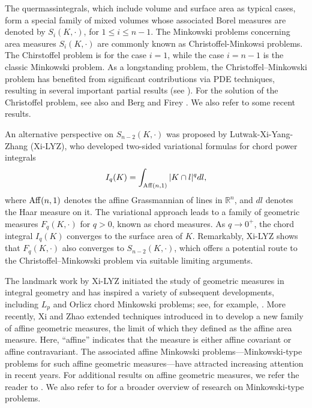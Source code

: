 \documentclass[12pt, oneside,reqno]{amsart}
\numberwithin{equation}{section}
\newtheorem{definition and theorem}[theorem]{Definition and Theorem}
\theoremstyle{plain}
\theoremstyle{remark}
\theoremstyle{definition}
\newcommand{\rn}{\mathbb R^n}
\begin{document}
The quermassintegrals, which include volume and surface area as typical cases, form a special family of mixed volumes whose associated Borel measures are denoted by $S_{i}(K,\cdot)$, for $1\leq i\leq n-1$.
The Minkowski problems concerning area measures $S_{i}(K,\cdot)$ are commonly known as Christoffel-Minkowsi problems.
The Chirstoffel problem is for the case $i=1$, while the case $i=n-1$ is the classic Minkowski problem. As a longstanding problem, the Christoffel–Minkowski problem has benefited from significant contributions via PDE techniques, resulting in several important partial results (see  \cite{GG, GLL, GM, GMZ}). For the solution of the Christoffel problem, see also \cite{GYY, GZ2, Sch1} and Berg and Firey \cite[Section 8.3.2]{Sch}. We also refer \cite{BHM1,BHM2, CGSF, MU} to some recent results.

An alternative perspective on $S_{n-2}(K,\cdot)$ was proposed by Lutwak-Xi-Yang-Zhang \cite{LXYZ2020} (Xi-LYZ), who developed two-sided variational formulas for chord power integrals 
\[I_q(K)=\int_{{\rm Aff}(n,1)}|K\cap l|^q dl,\]
where ${\rm Aff}(n,1)$ denotes the affine Grassmannian of lines in $\rn$, and $dl$ denotes the Haar measure on it. 
The variational approach leads to a family of 
geometric measures $F_q(K,\cdot)$ for $q>0$, known as chord measures. As $q\rightarrow 0^+$, the chord integral $I_q(K)$ converges to the surface area of $K$. Remarkably, Xi-LYZ \cite{LXYZ2020} shows that $F_q(K,\cdot)$ also  converges to $S_{n-2}(K,\cdot)$, which offers a potential route to the Christoffel–Minkowski problem via suitable limiting arguments.
 
 
The landmark work by Xi-LYZ\cite{LXYZ2020} initiated the study of geometric measures in integral geometry and has inspired a variety of subsequent developments, including   $L_p$ and Orlicz chord Minkowski problems; see, for example, \cite{GXZ, HHLW, Li, LCJ, LJ}. More recently, Xi and Zhao \cite{XZ} extended techniques introduced in \cite{LXYZ2020} to develop a new family of affine geometric measures, the limit of which they defined as the affine area measure. Here, “affine” indicates that the measure is either affine covariant or affine contravariant. The associated affine Minkowski problems—Minkowski-type problems for such affine geometric measures—have attracted increasing attention in recent years. For additional results on affine geometric measures, we refer the reader to \cite{BH, BLYZ2013, CLWX, CLWX2, LW}. {We also refer to \cite{HLYZ} for a broader overview of research on Minkowski-type problems.}
\end{document}
